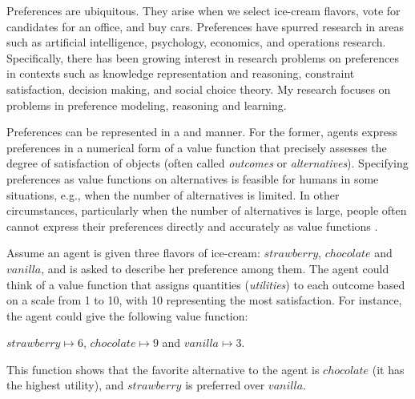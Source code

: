 Preferences are ubiquitous.
They arise when we select ice-cream flavors, vote for candidates for an office,
and buy cars.
Preferences have spurred research in areas such as 
artificial intelligence, psychology, economics, and operations research.
Specifically, there has been growing interest in research problems on
preferences in contexts such as knowledge representation and reasoning, constraint 
satisfaction, decision making, and social choice theory. 
My research focuses on problems in preference modeling, 
reasoning and learning.

Preferences can be represented in a  and  manner.
For the former, agents express preferences in a numerical form of
a value function that precisely assesses the degree of satisfaction
of objects
(often called \textit{outcomes} or \textit{alternatives}).
Specifying preferences as value functions on alternatives
is feasible for humans in some situations, e.g., 
when the number of alternatives is limited.
In other circumstances, particularly when the number of alternatives is large,
people often cannot express their 
preferences directly and accurately as value 
functions \cite{Domshlak20111037}.

Assume an agent is given three flavors of ice-cream:
$strawberry$, $chocolate$ and $vanilla$, and is asked to describe 
her preference among them.
The agent could think of a value function that
assigns quantities (\textit{utilities}) to each outcome
based on a scale from 1 to 10, with 10 representing the most satisfaction.
For instance, the agent could give the following value function:
\begin{center}
	$strawberry \mapsto 6$, $chocolate \mapsto 9$ and $vanilla \mapsto 3$.
\end{center}
This function shows that the favorite alternative to the agent is
$chocolate$ (it has the highest utility), and
$strawberry$ is preferred over $vanilla$.

